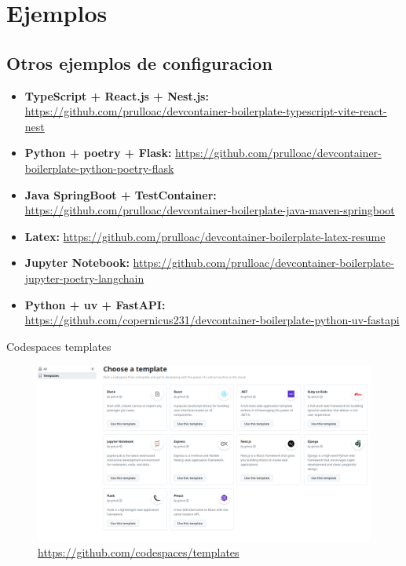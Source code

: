 \documentclass{beamer}
\begin{document}
\section{Ejemplos}
\subsection{Otros ejemplos de configuracion}
\begin{frame}{\subsecname}
  \begin{itemize}
    \small
    \item \textbf{TypeScript + React.js + Nest.js:} \href{https://github.com/prulloac/devcontainer-boilerplate-typescript-vite-react-nest}{https://github.com/prulloac/devcontainer-boilerplate-typescript-vite-react-nest}
    \item \textbf{Python + poetry + Flask:} \href{https://github.com/prulloac/devcontainer-boilerplate-python-poetry-flask}{https://github.com/prulloac/devcontainer-boilerplate-python-poetry-flask}
    \item \textbf{Java SpringBoot + TestContainer:} \href{https://github.com/prulloac/devcontainer-boilerplate-java-maven-springboot}{https://github.com/prulloac/devcontainer-boilerplate-java-maven-springboot}
    \item \textbf{Latex:} \href{https://github.com/prulloac/devcontainer-boilerplate-latex-resume}{https://github.com/prulloac/devcontainer-boilerplate-latex-resume}
    \item \textbf{Jupyter Notebook:} \href{https://github.com/prulloac/devcontainer-boilerplate-jupyter-poetry-langchain}{https://github.com/prulloac/devcontainer-boilerplate-jupyter-poetry-langchain}
    \item \textbf{Python + uv + FastAPI:} \href{https://github.com/copernicus231/devcontainer-boilerplate-python-uv-fastapi}{https://github.com/copernicus231/devcontainer-boilerplate-python-uv-fastapi}
    \normalsize
  \end{itemize}
\end{frame}
\begin{frame}{Codespaces templates}
  \begin{figure}
    \centering
    \includegraphics[width=\textwidth]{images/codespaces-templates.png}
    \caption{\href{https://github.com/codespaces/templates}{https://github.com/codespaces/templates}}
  \end{figure}
\end{frame}
\end{document}

